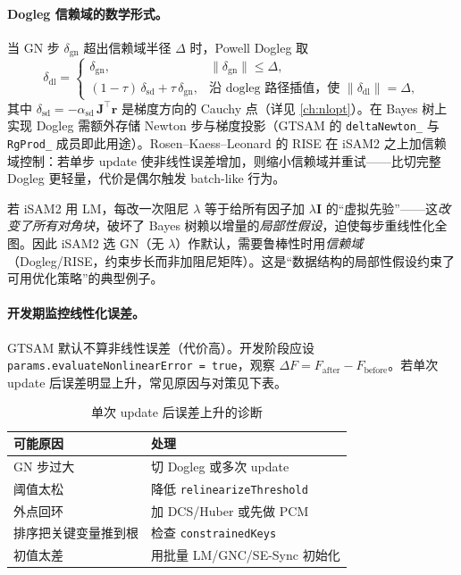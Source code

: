 \paragraph{Dogleg 信赖域的数学形式。}
当 GN 步 $\delta_{\text{gn}}$ 超出信赖域半径 $\Delta$ 时，Powell Dogleg 取
\begin{equation}
  \delta_{\text{dl}}=
  \begin{cases}
    \delta_{\text{gn}}, & \|\delta_{\text{gn}}\|\le\Delta,\\[2pt]
    (1-\tau)\,\delta_{\text{sd}}+\tau\,\delta_{\text{gn}}, & \text{沿 dogleg 路径插值，使 }\|\delta_{\text{dl}}\|=\Delta,
  \end{cases}
  \label{eq:dogleg}
\end{equation}
其中 $\delta_{\text{sd}}=-\alpha_{\text{sd}}\,\mathbf{J}^\top\mathbf{r}$ 是梯度方向的 Cauchy 点（详见 \cref{ch:nlopt}）。在 Bayes 树上实现 Dogleg 需额外存储 Newton 步与梯度投影（GTSAM 的 \texttt{deltaNewton\_} 与 \texttt{RgProd\_} 成员即此用途）。Rosen--Kaess--Leonard 的 RISE\cite{rosen2014rise} 在 iSAM2 之上加信赖域控制：若单步 update 使非线性误差增加，则缩小信赖域并重试——比切完整 Dogleg 更轻量，代价是偶尔触发 batch-like 行为。

\begin{insight}
若 iSAM2 用 LM，每改一次阻尼 $\lambda$ 等于给所有因子加 $\lambda\mathbf{I}$ 的“虚拟先验”——这\emph{改变了所有对角块}，破坏了 Bayes 树赖以增量的\emph{局部性假设}，迫使每步重线性化全图。因此 iSAM2 选 GN（无 $\lambda$）作默认，需要鲁棒性时用\emph{信赖域}（Dogleg/RISE，约束步长而非加阻尼矩阵）。这是“数据结构的局部性假设约束了可用优化策略”的典型例子。
\end{insight}

\paragraph{开发期监控线性化误差。}
GTSAM 默认不算非线性误差（代价高）。开发阶段应设 \texttt{params.evaluateNonlinearError = true}，观察 $\Delta F=F_{\text{after}}-F_{\text{before}}$。若单次 update 后误差明显上升，常见原因与对策见下表。

\begin{table}[H]\centering\small
\caption{单次 update 后误差上升的诊断}
\label{tab:error-up}
\begin{tabular}{ll}
\toprule
可能原因 & 处理 \\
\midrule
GN 步过大 & 切 Dogleg 或多次 update \\
阈值太松 & 降低 \texttt{relinearizeThreshold} \\
外点回环 & 加 DCS/Huber 或先做 PCM \\
排序把关键变量推到根 & 检查 \texttt{constrainedKeys} \\
初值太差 & 用批量 LM/GNC/SE-Sync 初始化 \\
\bottomrule
\end{tabular}
\end{table}

